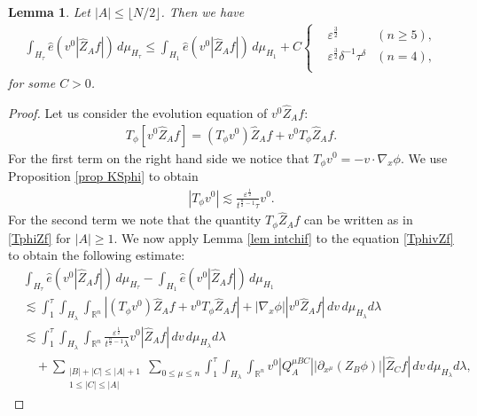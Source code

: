 \documentclass{article}
\newtheorem{lemma}{Lemma}[section]
\newcommand{\bbr}{{\mathbb R}}
\newcommand{\bbrn}{{\bbr^n}}
\begin{document}
%
\begin{lemma} \label{lem intchiZf2}
Let $ | A | \leq \lfloor N / 2 \rfloor $. Then we have
\begin{align*}
\int_{ H_\tau } \hat{ e } ( v^0 | \hat{ Z }_A f | ) \, d \mu_{ H_\tau } \leq \int_{ H_1 } \hat{ e } ( v^0 | \hat{ Z }_A f | ) \, d \mu_{ H_1 } + C
\left\{
\begin{aligned}
& \varepsilon^{ \frac32 } & ( n \geq 5 ) , \\
& \varepsilon^{ \frac32 } \delta^{ - 1 } \tau^\delta & ( n = 4 ) , \\
\end{aligned}
\right.
\end{align*}
for some $ C > 0 $.
\end{lemma}
%
\begin{proof}
Let us consider the evolution equation of $ v^0 \hat{ Z }_A f $:
\begin{align}
T_{ \phi } \left[ v^0 \hat{ Z }_A f \right] = ( T_\phi v^0 ) \hat{ Z }_A f + v^0 T_\phi \hat{ Z }_A f . \label{TphivZf}
\end{align}
For the first term on the right hand side we notice that $ T_\phi v^0 = - v \cdot \nabla_x \phi $. We use Proposition \ref{prop KSphi} to obtain
\begin{align*}
| T_\phi v^0 | \lesssim \frac{ \varepsilon^{ \frac12 } }{ t^{ \frac{ n }{ 2 } - 1 } \tau } v^0 .
\end{align*}
For the second term we note that the quantity $ T_\phi \hat{ Z }_A f $ can be written as in \eqref{TphiZf} for $ | A | \geq 1 $. We now apply Lemma \ref{lem intchif} to the equation \eqref{TphivZf} to obtain the following estimate:
\begin{align*}
& \int_{ H_\tau } \hat{ e } ( v^0 | \hat{ Z }_A f | ) \, d \mu_{ H_\tau } - \int_{ H_1 } \hat{ e } ( v^0 | \hat{ Z }_A f | ) \, d \mu_{ H_1 } \\
& \lesssim \int_1^\tau \int_{ H_\lambda } \int_\bbrn \left| ( T_\phi v^0 ) \hat{ Z }_A f + v^0 T_\phi \hat{ Z }_A f \right| + | \nabla_x \phi | | v^0 \hat{ Z }_A f | \, d v \, d \mu_{ H_\lambda } d \lambda \\
& \lesssim \int_1^\tau \int_{ H_\lambda } \int_\bbrn \frac{ \varepsilon^{ \frac12 } }{ t^{ \frac{ n }{ 2 } - 1 } \lambda } v^0 | \hat{ Z }_A f | \, d v \, d \mu_{ H_\lambda } d \lambda \\
& \quad + \sum_{ \substack{ | B | + | C | \leq | A | + 1 \\ 1 \leq | C | \leq | A | } } \sum_{ 0 \leq \mu \leq n } \int_1^\tau \int_{ H_\lambda } \int_\bbrn v^0 | Q^{ \mu B C }_{ A } | | \partial_{ x^\mu } ( Z_B \phi ) | | \hat{ Z }_C f | \, d v \, d \mu_{ H_\lambda } d \lambda ,

\end{align*}
\end{proof}
\end{document}
